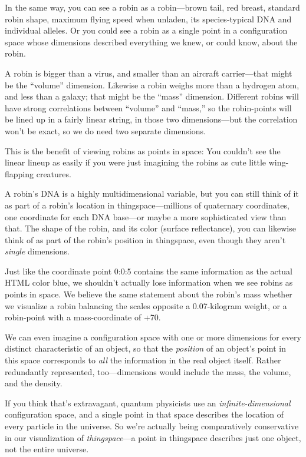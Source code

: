 {
 In the same way, you can see a robin as a robin---brown tail, red
breast, standard robin shape, maximum flying speed when unladen, its
species-typical DNA and individual alleles. Or you could see a robin as
a single point in a configuration space whose dimensions described
everything we knew, or could know, about the robin.}

{
 A robin is bigger than a virus, and smaller than an aircraft
carrier---that might be the
``volume'' dimension. Likewise a
robin weighs more than a hydrogen atom, and less than a galaxy; that
might be the ``mass'' dimension.
Different robins will have strong correlations between
``volume'' and
``mass,'' so the robin-points will
be lined up in a fairly linear string, in those two dimensions---but
the correlation won't be exact, so we do need two
separate dimensions.}

{
 This is the benefit of viewing robins as points in space: You
couldn't see the linear lineup as easily if you were
just imagining the robins as cute little wing-flapping creatures.}

{
 A robin's DNA is a highly multidimensional
variable, but you can still think of it as part of a
robin's location in thingspace---millions of quaternary
coordinates, one coordinate for each DNA base---or maybe a more
sophisticated view than that. The shape of the robin, and its color
(surface reflectance), you can likewise think of as part of the
robin's position in thingspace, even though they
aren't \textit{single} dimensions.}

{
 Just like the coordinate point 0:0:5 contains the same information
as the actual HTML color blue, we shouldn't actually
lose information when we see robins as points in space. We believe the
same statement about the robin's mass whether we
visualize a robin balancing the scales opposite a 0.07-kilogram weight,
or a robin-point with a mass-coordinate of +70.}

{
 We can even imagine a configuration space with one or more
dimensions for every distinct characteristic of an object, so that the
\textit{position} of an object's point in this space
corresponds to \textit{all} the information in the real object itself.
Rather redundantly represented, too---dimensions would include the
mass, the volume, and the density.}

{
 If you think that's extravagant, quantum
physicists use an \textit{infinite-dimensional} configuration space,
and a single point in that space describes the location of every
particle in the universe. So we're actually being
comparatively conservative in our visualization of
\textit{thingspace}{}---a point in thingspace describes just one
object, not the entire universe.}

